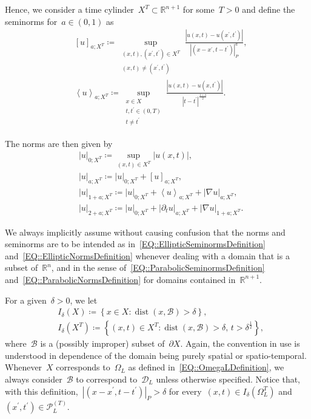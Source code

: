\documentclass[12pt,a4paper]{amsart}
\numberwithin{equation}{section}
\theoremstyle{definition}
\theoremstyle{remark}
\newcommand{\R}{\mathbb{R}}
\newcommand{\abs}[1]{\left\lvert#1\right\rvert}
\begin{document}
\begin{appendix}
Hence, we consider a time cylinder~$X^T \subset \R^{n+1}$ for some~$T>0$ and define the seminorms for~$a \in (0,1)$ as
\begin{equation}\label{EQ::ParabolicSeminormsDefinition}
    \begin{split}
        &{\left[u\right]}_{a; X^T} \coloneq \sup_{\substack{(x,t),(x^\prime, t^\prime) \in X^T\\(x,t)\neq(x^\prime, t^\prime)}} \frac{\abs{u(x,t) - u(x^\prime,t^\prime)}}{\abs{(x-x^\prime, t-t^\prime)}_P^a},\\
        &\left\langle u\right\rangle_{a; X^T} \coloneq \sup_{\substack{x\in X\\t,t^\prime \in (0,T)\\t\neq t^\prime}} \frac{\abs{u(x,t) - u(x,t^\prime)}}{\abs{t-t^\prime}^{\frac{1+a}{2}}}.
    \end{split}
\end{equation}

The norms are then given by
\begin{equation}\label{EQ::ParabolicNormsDefinition}
    \begin{split}
        &\abs{u}_{0; X^T} \coloneq \sup_{(x,t) \in X^T} \abs{u(x,t)},\\
        &\abs{u}_{a; X^T} \coloneq \abs{u}_{0; X^T} + {\left[u\right]}_{a; X^T},\\
        &\abs{u}_{1+a; X^T} \coloneq \abs{u}_{0; X^T} + \left\langle u\right\rangle_{a; X^T} + \abs{\nabla u}_{a; X^T},\\
        &\abs{u}_{2+a; X^T} \coloneq \abs{u}_{0; X^T} + \abs{\partial_t u}_{a; X^T} + \abs{\nabla u}_{1+a; X^T}.
    \end{split}
\end{equation}

We always implicitly assume without causing confusion that the norms and seminorms are to be intended as in~\eqref{EQ::EllipticSeminormsDefinition} and~\eqref{EQ::EllipticNormsDefinition} whenever dealing with a domain that is a subset of~$\R^n$, and in the sense of~\eqref{EQ::ParabolicSeminormsDefinition} and~\eqref{EQ::ParabolicNormsDefinition} for domains contained in~$\R^{n+1}$.

For a given~$\delta > 0$, we let
\begin{align}
    &I_\delta(X) \coloneq \left\{x \in X \colon \operatorname{dist}(x,\mathcal{B}) > \delta\right\},\\
    &I_\delta(X^T) \coloneq \left\{ (x,t) \in X^T \colon \operatorname{dist}(x,\mathcal{B}) > \delta,\, t > \delta^{\frac{1}{2}}\right\},
\end{align}
where~$\mathcal{B}$ is a (possibly improper) subset of~$\partial X$. Again, the convention in use is understood in dependence of the domain being purely spatial or spatio-temporal. Whenever~$X$ corresponds to~$\Omega_L$ as defined in~\eqref{EQ::OmegaLDefinition}, we always consider~$\mathcal{B}$ to correspond to~$\mathcal{D}_L$ unless otherwise specified. Notice that, with this definition,~$\abs{(x-x^\prime,t-t^\prime)}_P > \delta$ for every~$(x,t) \in I_\delta(\Omega_L^T)$ and~$(x^\prime,t^\prime) \in \mathcal{P}_L^{(T)}$.


\end{appendix}
\end{document}
